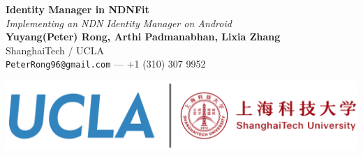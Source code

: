 \documentclass[a0,portrait]{poster}
\begin{document}


\begin{minipage}[b]{0.6\linewidth}
\veryHuge \color{NavyBlue} \textbf{Identity Manager in NDNFit} \color{Black}\\ %
\Huge\textit{Implementing an NDN Identity Manager on Android}\\[2cm] %
\Large \textbf{Yuyang(Peter) Rong, Arthi Padmanabhan, Lixia Zhang \footnotemark}\\[0.5cm] %
\Large ShanghaiTech / UCLA \\ [0.4cm] %
\Large \texttt{PeterRong96@gmail.com} --- +1 (310) 307 9952\\
\end{minipage}
%
\begin{minipage}[b]{0.4\linewidth}
	\includegraphics[width=\linewidth]{figures/logo.png}\\
\end{minipage}

\vspace{0.7cm} %

\end{document}
